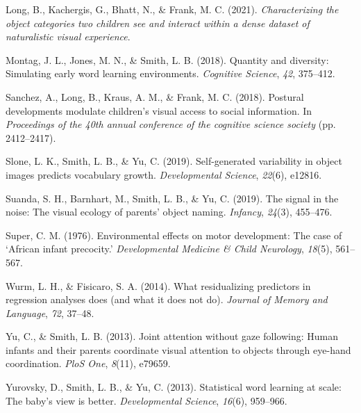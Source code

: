 \documentclass[10pt, letterpaper]{article}
\newenvironment{CSLReferences}%
  {}%
  {\par}
\begin{document}
\begin{CSLReferences}{1}{0}
\leavevmode\hypertarget{ref-long2021characterizing}{}%
Long, B., Kachergis, G., Bhatt, N., \& Frank, M. C. (2021).
\emph{Characterizing the object categories two children see and interact
within a dense dataset of naturalistic visual experience}.

\leavevmode\hypertarget{ref-montag2018quantity}{}%
Montag, J. L., Jones, M. N., \& Smith, L. B. (2018). Quantity and
diversity: Simulating early word learning environments. \emph{Cognitive
Science}, \emph{42}, 375--412.

\leavevmode\hypertarget{ref-sanchez2018detecting}{}%
Sanchez, A., Long, B., Kraus, A. M., \& Frank, M. C. (2018). Postural
developments modulate children's visual access to social information. In
\emph{Proceedings of the 40th annual conference of the cognitive science
society} (pp. 2412--2417).

\leavevmode\hypertarget{ref-slone2019self}{}%
Slone, L. K., Smith, L. B., \& Yu, C. (2019). Self-generated variability
in object images predicts vocabulary growth. \emph{Developmental
Science}, \emph{22}(6), e12816.

\leavevmode\hypertarget{ref-suanda2019signal}{}%
Suanda, S. H., Barnhart, M., Smith, L. B., \& Yu, C. (2019). The signal
in the noise: The visual ecology of parents' object naming.
\emph{Infancy}, \emph{24}(3), 455--476.

\leavevmode\hypertarget{ref-super1976environmental}{}%
Super, C. M. (1976). Environmental effects on motor development: The
case of {`{A}frican infant precocity.'} \emph{Developmental Medicine \&
Child Neurology}, \emph{18}(5), 561--567.

\leavevmode\hypertarget{ref-wurm2014residualizing}{}%
Wurm, L. H., \& Fisicaro, S. A. (2014). What residualizing predictors in
regression analyses does (and what it does not do). \emph{Journal of
Memory and Language}, \emph{72}, 37--48.

\leavevmode\hypertarget{ref-yu2013joint}{}%
Yu, C., \& Smith, L. B. (2013). Joint attention without gaze following:
Human infants and their parents coordinate visual attention to objects
through eye-hand coordination. \emph{PloS One}, \emph{8}(11), e79659.

\leavevmode\hypertarget{ref-yurovsky2013statistical}{}%
Yurovsky, D., Smith, L. B., \& Yu, C. (2013). Statistical word learning
at scale: The baby's view is better. \emph{Developmental Science},
\emph{16}(6), 959--966.

\end{CSLReferences}


\end{document}
